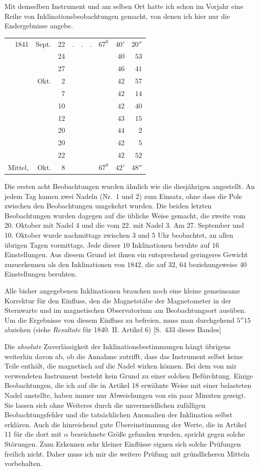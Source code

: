 Mit demselben Instrument und am selben Ort hatte ich schon im Vorjahr eine Reihe von Inklinationsbeobachtungen gemacht, von denen ich hier nur die Endergebnisse angebe.
\begin{center}
\begin{tabular}{rrrcrrr}
1841&Sept.&22&$.\quad.\quad.$&$67^0$&$40'$&$20''$\\
&&24&&&$40$&$53$\\
&&27&&&$46$&$41$\\
&Okt.&2&&&$42$&$57$\\
&&7&&&$42$&$14$\\
&&10&&&$42$&$40$\\
&&12&&&$43$&$15$\\
&&20&&&$44$&$2$\\
&&20&&&$42$&$5$\\
&&22&&&$42$&$52$\\\hline
Mittel,&Okt.&8&&$67^0$&$42'$&$48''$
\end{tabular}
\end{center}
Die ersten acht Beobachtungen wurden ähnlich wie die diesjährigen angestellt. An jedem Tag kamen zwei Nadeln (Nr.\ 1 und 2) zum Einsatz, ohne dass die Pole zwischen den Beobachtungen umgekehrt wurden. Die beiden letzten Beobachtungen wurden dagegen auf die übliche Weise gemacht, die zweite vom 20. Oktober mit Nadel 4 und die vom 22. mit Nadel 3. Am 27. September und 10. Oktober wurde nachmittags zwischen $3$ und $5$ Uhr beobachtet, an allen übrigen Tagen vormittags. Jede dieser $10$ Inklinationen beruhte auf $16$ Einstellungen. Aus diesem Grund ist ihnen ein entsprechend geringeres Gewicht zuzuerkennen als den Inklinationen von $1842$, die auf $32$, $64$ beziehungsweise $40$ Einstellungen beruhten.

Alle bisher angegebenen Inklinationen brauchen noch eine kleine gemeinsame Korrektur für den Einfluss, den die Magnetstäbe der Magnetometer in der Sternwarte und im magnetischen Observatorium am Beobachtungsort ausüben. Um die Ergebnisse von diesem Einfluss zu befreien, muss man durchgehend $5''15$ abziehen (siehe \textit{Resultate} für 1840. II. Artikel 6) [S.\ 433 dieses Bandes]

Die \textit{absolute} Zuverlässigkeit der Inklinationsbestimmungen hängt übrigens weiterhin davon ab, ob die Annahme zutrifft, dass das Instrument selbst keine Teile enthält, die magnetisch auf die Nadel wirken können. Bei dem von mir verwendeten Instrument besteht kein Grund zu einer solchen Befürchtung. Einige Beobachtungen, die ich auf die in Artikel 18 erwähnte Weise mit einer belasteten Nadel anstellte, haben immer nur Abweichungen von ein paar Minuten gezeigt. Sie lassen sich ohne Weiteres durch die unvermeidlichen zufälligen Beobachtungsfehler und die tatsächlichen Anomalien der Inklination selbst erklären. Auch die hinreichend gute Übereinstimmung der Werte, die in Artikel 11 für die dort mit $\alpha$ bezeichnete Größe gefunden wurden, spricht gegen solche Störungen. Zum Erkennen sehr kleiner Einflüsse eignen sich solche Prüfungen freilich nicht. Daher muss ich mir die weitere Prüfung mit gründlicheren Mitteln vorbehalten.

